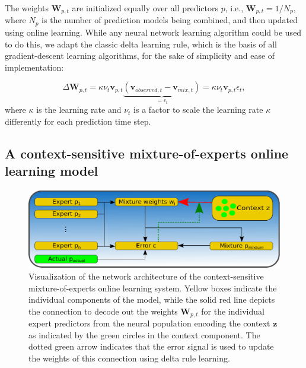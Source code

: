 The weights $ \mathbf{W}_{ p ,t}$ are initialized equally over all predictors $ p$, i.e., $\mathbf{W}_{ p ,t} = 1/N_p$, where $N_p$ is the number of prediction models being combined, and then updated using online learning.
While any neural network learning algorithm could be used to do this, we adapt the classic delta learning rule, which is the basis of all gradient-descent learning algorithms, for the sake of simplicity and ease of implementation:

\begin{equation}
  \label{eq:mix_learning1}
\Delta\mathbf{W}_{p,t} = \kappa \nu_{t} \mathbf{v}_{p,t} \underbrace{(\mathbf{v}_{observed,t}-\mathbf{v}_{mix,t})}_{=\epsilon_t} = \kappa \nu_{t} \mathbf{v}_{p,t} \epsilon_t,
\end{equation}
where $\kappa$ is the learning rate and $\nu_{t}$ is a factor to scale the learning rate $\kappa$ differently for each prediction time step.

\subsection{A context-sensitive mixture-of-experts online learning model}%
\label{subsec:a_context_sensitive_mixture_of_experts_online_learning_model}

\begin{figure}[t!]
    \centering
    \includegraphics[width=\textwidth]{imgs/mix_system_arch.eps}
    \caption{Visualization of the network architecture of the context-sensitive mixture-of-experts online learning system.
    Yellow boxes indicate the individual components of the model, while the solid red line depicts the connection to decode out the weights $ \mathbf{W}_{p,t}$ for the individual expert predictors from the neural population encoding the context $\mathbf{z}$ as indicated by the green circles in the context component.
    The dotted green arrow indicates that the error signal is used to update the weights of this connection using delta rule learning.}
    \label{fig:mix_context_sensitive_system_arch}
\end{figure}

